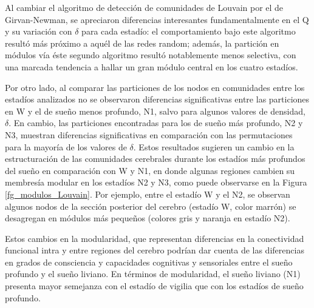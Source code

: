 \documentclass{article}
\begin{document}
Al cambiar el algoritmo de detección de comunidades de Louvain por el de Girvan-Newman, se apreciaron diferencias interesantes fundamentalmente en el Q y su variación con $\delta$ para cada estadío: el comportamiento bajo este algoritmo resultó más próximo a aquél de las redes random; además, la partición en módulos vía éste segundo algoritmo resultó notablemente menos selectiva, con una marcada tendencia a hallar un gran módulo central en los cuatro estadíos. 

Por otro lado, al comparar las particiones de los nodos en comunidades entre los estadíos analizados no se observaron diferencias significativas entre las particiones en W y el de sueño menos profundo, N1, salvo para algunos valores de densidad, $\delta$. En cambio, las particiones encontradas para los de sueño más profundo, N2 y N3, muestran diferencias significativas en comparación con las permutaciones para la mayoría de los valores de $\delta$. Estos resultados sugieren un cambio en la estructuración de las comunidades cerebrales durante los estadíos más profundos del sueño en comparación con W y N1, en donde algunas regiones cambien su membresía modular en los estadíos N2 y N3, como puede observarse en la Figura \ref{fg_modulos_Louvain}. Por ejemplo, entre el estadío W y el N2, se observan algunos nodos de la sección posterior del cerebro (estadío W, color marrón) se desagregan en módulos más pequeños (colores gris y naranja en estadío N2).

Estos cambios en la modularidad, que representan diferencias en la conectividad funcional intra y entre regiones del cerebro podrían dar cuenta de las diferencias en grados de consciencia y capacidades cognitivas y sensoriales entre el sueño profundo y el sueño liviano. En términos de modularidad, el sueño liviano (N1) presenta mayor semejanza con el estadío de vigilia que con los estadíos de sueño profundo.


\printbibliography[title= Referencias, heading=bibintoc]
\end{document}
